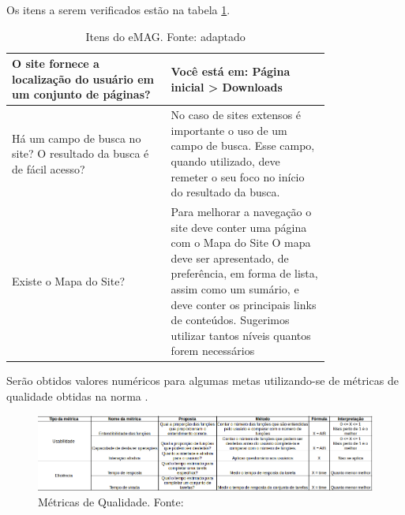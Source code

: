   Os itens a serem verificados estão na tabela \ref{tab:emag}.
  
  \begin{table}[!h]
\caption{Itens do eMAG. Fonte: \cite{emag} adaptado}
\centering
\label{tab:emag}
  \begin{tabular}{p{0.40\linewidth}p{0.40\linewidth}}
  \hline
  O site fornece a localização do usuário em um conjunto de páginas? & Você está em: Página inicial > Downloads\\
  \hline
  Há um campo de busca no site? O resultado da busca é de fácil acesso? & No caso de sites extensos é importante o uso de um campo de busca. Esse campo, quando utilizado, deve remeter o seu foco no início do resultado da busca.\\
\hline
Existe o Mapa do Site? & Para melhorar a navegação o site deve conter uma página com o Mapa do Site O mapa deve ser apresentado, de preferência, em forma de lista, assim como um sumário, e deve conter os principais links de conteúdos. Sugerimos utilizar tantos níveis quantos forem necessários\\
 \hline
  \end{tabular}
\end{table}

  
  Serão obtidos valores numéricos para algumas metas utilizando-se de métricas de qualidade obtidas na
  norma .
\vfill
  \pagebreak
  \begin{figure}[!h]
  \centering
    \includegraphics[keepaspectratio=true, scale=0.6, angle=-90]{figuras/qualidade.png}
  \caption{Métricas de Qualidade. Fonte: \cite{iso}}
  \label{fig:metricas}
\end{figure}

\pagebreak

% 
% 
